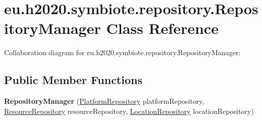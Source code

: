 \hypertarget{classeu_1_1h2020_1_1symbiote_1_1repository_1_1RepositoryManager}{}\section{eu.\+h2020.\+symbiote.\+repository.\+Repository\+Manager Class Reference}
\label{classeu_1_1h2020_1_1symbiote_1_1repository_1_1RepositoryManager}


Collaboration diagram for eu.\+h2020.\+symbiote.\+repository.\+Repository\+Manager\+:
\subsection*{Public Member Functions}
\begin{DoxyCompactItemize}
\item 
{\bfseries Repository\+Manager} (\hyperlink{interfaceeu_1_1h2020_1_1symbiote_1_1repository_1_1PlatformRepository}{Platform\+Repository} platform\+Repository, \hyperlink{interfaceeu_1_1h2020_1_1symbiote_1_1repository_1_1ResourceRepository}{Resource\+Repository} resource\+Repository, \hyperlink{interfaceeu_1_1h2020_1_1symbiote_1_1repository_1_1LocationRepository}{Location\+Repository} location\+Repository)\hypertarget{classeu_1_1h2020_1_1symbiote_1_1repository_1_1RepositoryManager_a7402e1dfdea6c3e6a0d8b84d4e56b7a6}{}\label{classeu_1_1h2020_1_1symbiote_1_1repository_1_1RepositoryManager_a7402e1dfdea6c3e6a0d8b84d4e56b7a6}


\end{DoxyCompactItemize}
